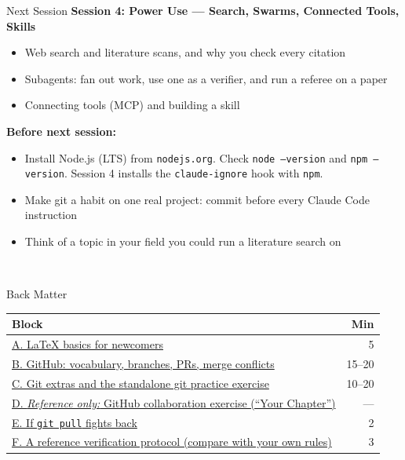 \documentclass[aspectratio=169, 11pt]{beamer}
\begin{document}
\begin{frame}{Next Session}
  \textbf{Session 4: Power Use --- Search, Swarms, Connected Tools, Skills}

  \vspace{1em}
  \begin{itemize}
    \item Web search and literature scans, and why you check every citation
    \item Subagents: fan out work, use one as a verifier, and run a referee on a paper
    \item Connecting tools (MCP) and building a skill
  \end{itemize}

  \vspace{1em}
  \textbf{Before next session:}
  \begin{itemize}
    \item \alert{Install Node.js (LTS)} from \texttt{nodejs.org}. Check \texttt{node --version} and \texttt{npm --version}. Session 4 installs the \texttt{claude-ignore} hook with \texttt{npm}.
    \item Make git a habit on one real project: commit before every Claude Code instruction
    \item Think of a topic in your field you could run a literature search on
  \end{itemize}
\end{frame}

\begin{frame}
  ~
\end{frame}


\appendix

\begin{frame}[label=backmatter]{Back Matter}
  \small
  \begin{tabular}{@{}lr@{}}
    \toprule
    \textbf{Block} & \textbf{Min} \\
    \midrule
    \hyperlink{latexbasics}{A. \LaTeX{} basics for newcomers} & 5 \\
    \hyperlink{github}{B. GitHub: vocabulary, branches, PRs, merge conflicts} & 15--20 \\
    \hyperlink{gitextras}{C. Git extras and the standalone git practice exercise} & 10--20 \\
    \hyperlink{collab}{D. \textit{Reference only:} GitHub collaboration exercise (``Your Chapter'')} & --- \\
    \hyperlink{gitpull}{E. If \texttt{git pull} fights back} & 2 \\
    \hyperlink{refprotocol}{F. A reference verification protocol (compare with your own rules)} & 3 \\
    \bottomrule
  \end{tabular}
\end{frame}
\end{document}
